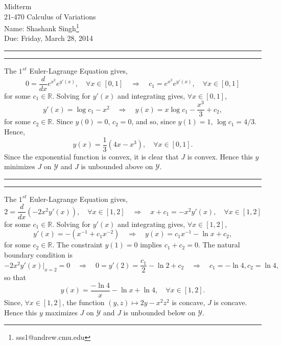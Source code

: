 \documentclass[11pt]{article}
\makeatletter
\newcounter{questionCounter}
\newcounter{partCounter}[questionCounter]
\newenvironment{question}[2][\arabic{questionCounter}]{%
    \setcounter{partCounter}{0}%
    \vspace{.25in} \hrule \vspace{0.5em}%
        \noindent{\bf #2}%
    \vspace{0.8em} \hrule \vspace{.10in}%
    \addtocounter{questionCounter}{1}%
}{}
\newcommand{\myname}{Shashank Singh\footnote{sss1@andrew.cmu.edu}}
\newcommand{\myclass}{21-470 Calculus of Variations}
\newcommand{\duedate}{Friday, March 28, 2014}
\newcommand{\R}{\mathbb{R}}             %
\newcommand{\Y}{\mathscr{Y}}            %
\makeatother
\begin{document}
\thispagestyle{plain}

{\Large Midterm} \\
\myclass \\
Name: \myname \\
Due: \duedate

\begin{question}{Problem 1}
The $1^{st}$ Euler-Lagrange Equation gives,
\[0 = \frac{d}{dx} e^{x^2}e^{y'(x)}, \quad \forall x \in [0,1]
    \quad \Rightarrow \quad
    c_1 = e^{x^2}e^{y'(x)}, \quad \forall x \in [0,1]
\]
for some $c_1 \in \R$. Solving for $y'(x)$ and integrating gives,
$\forall x \in [0,1]$,
\[y'(x) = \log c_1 - x^2
    \quad \Rightarrow \quad
    y(x) = x\log c_1 - \frac{x^3}{3} + c_2,
\]
for some $c_2 \in \R$. Since $y(0) = 0$, $c_2 = 0$, and so, since $y(1) = 1$,
$\log c_1 = 4/3$. Hence,
\[y(x) = \frac{1}{3} \left( 4x - x^3 \right), \quad \forall x \in [0,1].\]
Since the exponential function is convex, it is clear that $J$ is convex. Hence
this $y$ minimizes $J$ on $\Y$ and $J$ is unbounded above on $\Y$.
\end{question}

\begin{question}{Problem 2}
The $1^{st}$ Euler-Lagrange Equation gives,
\[2 = \frac{d}{dx} \left( -2x^2y'(x) \right), \quad \forall x \in [1,2]
    \quad \Rightarrow \quad
    x + c_1 = -x^2y'(x), \quad \forall x \in [1,2]
\]
for some $c_1 \in \R$. Solving for $y'(x)$ and integrating gives,
$\forall x \in [1,2]$,
\[y'(x) = - \left( x^{-1} + c_1x^{-2}\right)
    \quad \Rightarrow \quad
    y(x) = c_1x^{-1} - \ln x + c_2,
\]
for some $c_2 \in \R$. The constraint $y(1) = 0$ implies $c_1 + c_2 = 0$. The
natural boundary condition is
\[-2x^2y'(x) \bigg|_{x = 2} = 0
    \quad \Rightarrow \quad
    0 = y'(2) = \frac{c_1}{2} - \ln 2 + c_2
    \quad \Rightarrow \quad
    c_1 = - \ln 4, c_2 = \ln 4,
\]
so that
\[y(x) = \frac{- \ln 4}{x} - \ln x + \ln 4, \quad \forall x \in [1,2].\]
Since, $\forall x \in [1,2]$, the function $(y,z) \mapsto 2y - x^2z^2$ is
concave, $J$ is concave. Hence this $y$ maximizes $J$ on $\Y$ and $J$ is
unbounded below on $\Y$.
\end{question}
\end{document}
